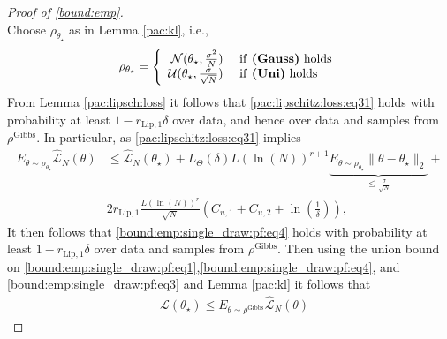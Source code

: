 \documentclass{article}
\newcommand{\KL}{\mathrm{KL}}
\renewcommand{\KL}{\mathrm{KL}}
\begin{document}
\begin{proof}[Proof of \eqref{bound:emp}]
\begin{equation}
    \end{equation}
    Choose $\rho_{\theta_{\star}}$ as in Lemma \ref{pac:kl}, i.e., 
    \[ \rho_{\theta_{\star}}=\left\{ \begin{array}{rl}
                           \mathcal{N}(\theta_{\star},\frac{\sigma^2}{N}) & \mbox{ if \textbf{(Gauss)} holds} \\
                            \mathcal{U}(\theta_{\star},\frac{\sigma}{\sqrt{N}})  & \mbox{ if \textbf{(Uni)} holds}
                         \end{array} \right. 
   \]
      From Lemma \ref{pac:lipsch:loss} it follows that \eqref{pac:lipschitz:loss:eq31} holds with probability at least 
  $1-r_{\text{Lip},1}\delta$ over data, and hence over data and samples from $\rho^{\text{Gibbs}}$. 
    In particular, as \eqref{pac:lipschitz:loss:eq31} implies
   \begin{equation}
    \label{bound:emp:single_draw:pf:eq4}
    \begin{aligned}
    E_{\theta \sim \rho_{\theta_{\star}}} \hat{\mathcal{L}}_N(\theta) & \le \hat{\mathcal{L}}_N(\theta_{\star})+
     L_{\Theta}(\delta) L(\ln(N))^{r+1} \underbrace{E_{\theta \sim \rho_{\theta_{\star}}}\|\theta - \theta_{\star}\|_2}_{\le \frac{\sigma}{\sqrt{N}}}
           +  \\
           & 2r_{\text{Lip},1}\frac{L(\ln(N))^{r}}{\sqrt{N}}\left(C_{u,1} + C_{u,2}+\ln\left(\frac{1}{\delta}\right)\right), 
    \end{aligned}
    \end{equation}
   It then follows that \eqref{bound:emp:single_draw:pf:eq4}
   holds with probability at least $1-r_{\text{Lip},1}\delta$
   over data and samples from $\rho^{\text{Gibbs}}$.
   Then using the union bound on \eqref{bound:emp:single_draw:pf:eq1},\eqref{bound:emp:single_draw:pf:eq4},  and \eqref{bound:emp:single_draw:pf:eq3} and Lemma \ref{pac:kl} it follows that
   \begin{equation}
   \label{bound:emp:single_draw:pf:eq5}
   \begin{aligned}
         & \mathcal{L}(\theta_{\star}) \le  E_{\theta \sim \rho^{\text{Gibbs}}} \hat{\mathcal{L}}_N(\theta) 

\end{aligned}
\end{equation}
\end{proof}
\end{document}

